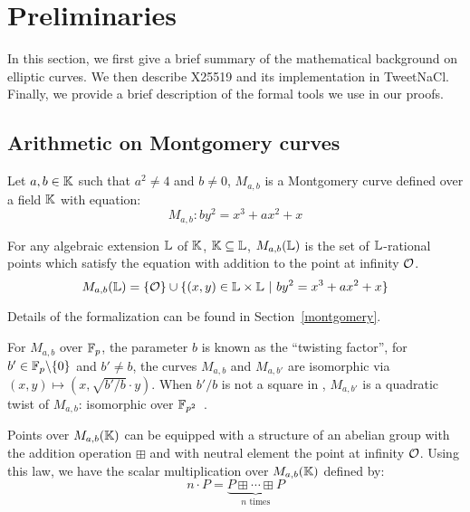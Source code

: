 \section{Preliminaries}
\label{preliminaries}

In this section, we first give a brief summary of the mathematical background
on elliptic curves. We then describe X25519 and its implementation in TweetNaCl.
Finally, we provide a brief description of the formal tools we use in our proofs.

\subsection{Arithmetic on Montgomery curves}
\label{subsec:montgomery}

\begin{definition}
  Let $a,b \in \mathbb{K}$ such that $a^2 \neq 4$ and $b \neq 0$, $M_{a,b}$ is a
  Montgomery curve defined over a field $\mathbb{K}$ with equation:
  $$M_{a,b}: by^2 = x^3 + ax^2 + x$$
\end{definition}

\begin{definition}
  For any algebraic extension $\mathbb{L}$ of $\mathbb{K}$, $\mathbb{K} \subseteq	\mathbb{L}$,
  $M_{a,b}(\mathbb{L})$ is the set of $\mathbb{L}$-rational points which satisfy the equation with
  addition to the point at infinity $\mathcal{O}$.
  $$M_{a,b}(\mathbb{L}) = \{\mathcal{O}\} \cup \{(x,y) \in \mathbb{L} \times \mathbb{L}~|~by^2 = x^3 + ax^2 + x\}$$
\end{definition}
Details of the formalization can be found in Section~\ref{montgomery}.

\begin{definition}
  For $M_{a,b}$ over $\mathbb{F}_{p}$, the parameter $b$ is known as the ``twisting factor'',
  for $b'\in \mathbb{F}_{p}\backslash\{0\}$ and $b' \neq b$, the curves $M_{a,b}$ and $M_{a,b'}$
  are isomorphic via $(x,y) \mapsto (x, \sqrt{b'/b} \cdot y)$.
  When $b'/b$ is not a square in , $M_{a,b'}$ is a quadratic twist of $M_{a,b}$:
  isomorphic over $\mathbb{F}_{p^2}$~\cite{cryptoeprint:2017:212}.
\end{definition}

Points over $M_{a,b}(\mathbb{K})$ can be equipped with a structure of an abelian group
with the addition operation $\boxplus$ and with neutral element the point at infinity $\mathcal{O}$.
Using this law, we have the scalar multiplication over $M_{a,b}(\mathbb{K})$ defined by:
  $$n\cdot P = \underbrace{P \boxplus \cdots \boxplus P}_{n\text{ times}}$$

